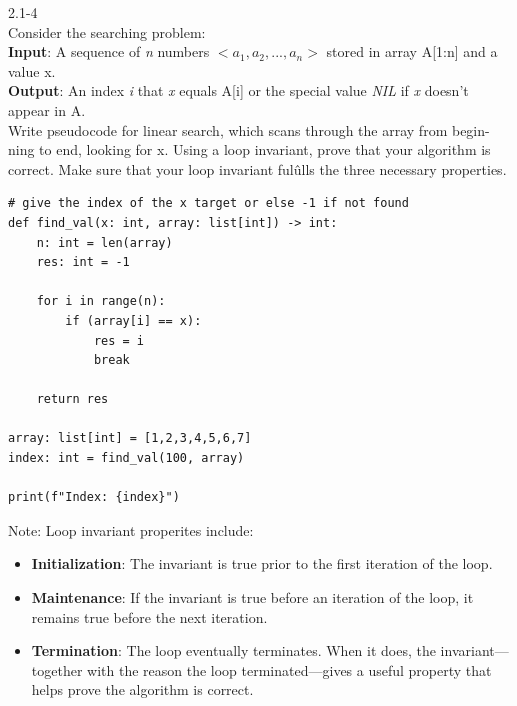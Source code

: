 2.1-4 \\
Consider the searching problem: \\
\textbf{Input}: A sequence of \textit{n} numbers $<a_1, a_2, ..., a_n>$ stored in array A[1:n] and a value x. \\
\textbf{Output}: An index \textit{i} that \textit{x} equals A[i] or the special value \textit{NIL} if \textit{x} doesn't appear in A. \\

Write pseudocode for linear search, which scans through the array from begin-ning to end, looking for 
x. Using a loop invariant, prove that your algorithm is 
correct. Make sure that your loop invariant fulûlls the three necessary properties.

\begin{verbatim}
# give the index of the x target or else -1 if not found
def find_val(x: int, array: list[int]) -> int:
    n: int = len(array)
    res: int = -1 

    for i in range(n):
        if (array[i] == x):
            res = i
            break
            
    return res
            
array: list[int] = [1,2,3,4,5,6,7]
index: int = find_val(100, array)

print(f"Index: {index}")
\end{verbatim}

Note: Loop invariant properites include:
\begin{itemize}
    \item \textbf{Initialization}: The invariant is true prior to the first iteration of the loop.
    
    \item \textbf{Maintenance}: If the invariant is true before an iteration of the loop, it remains true before the next iteration.
    
    \item \textbf{Termination}: The loop eventually terminates. When it does, the invariant—together with the reason the loop terminated—gives a useful property that helps prove the algorithm is correct.
\end{itemize}

